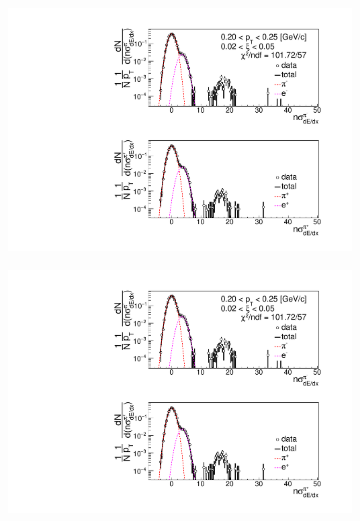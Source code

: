 \begin{figure}[h!]
\begin{subfigure}{.33\textwidth}
	\end{subfigure}
	\begin{subfigure}{.3\textwidth}
		\includegraphics[width=\linewidth, page=6]{chapters/chrgSTAR/img/dEdx/fit2019_secondStep_0_0.pdf}
	\end{subfigure}
	\begin{subfigure}{.33\textwidth}
		\includegraphics[width=\linewidth, page=7]{chapters/chrgSTAR/img/dEdx/fit2019_secondStep_0_0.pdf}
	\end{subfigure}
	\begin{subfigure}{.33\textwidth}

\end{subfigure}
\end{figure}
